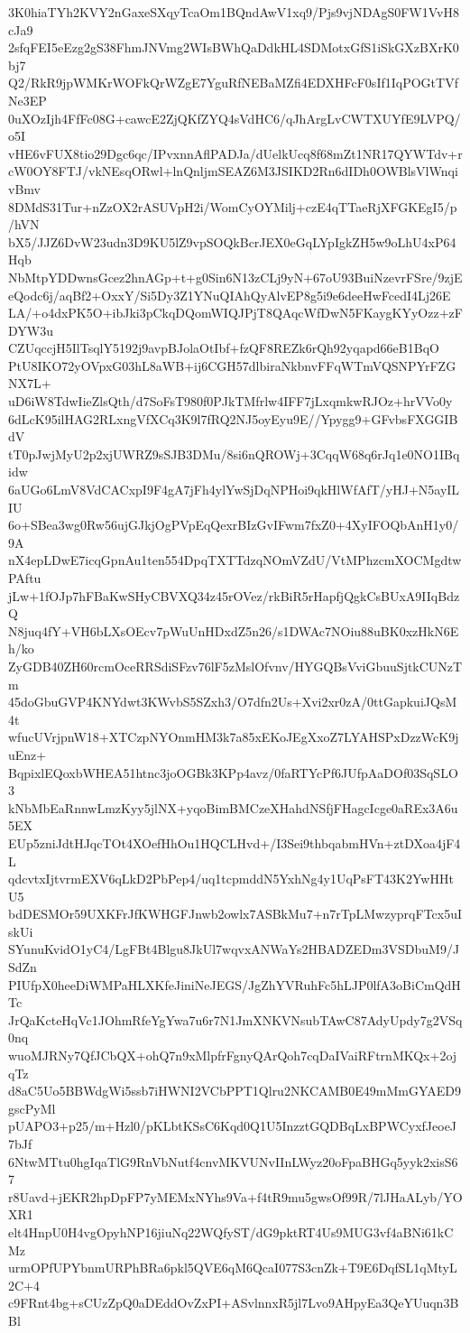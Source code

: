 3K0hiaTYh2KVY2nGaxeSXqyTcaOm1BQndAwV1xq9/Pjs9vjNDAgS0FW1VvH8cJa9
2sfqFEI5eEzg2gS38FhmJNVmg2WIsBWhQaDdkHL4SDMotxGfS1iSkGXzBXrK0bj7
Q2/RkR9jpWMKrWOFkQrWZgE7YguRfNEBaMZfi4EDXHFcF0sIf1IqPOGtTVfNe3EP
0uXOzIjh4FfFc08G+cawcE2ZjQKfZYQ4sVdHC6/qJhArgLvCWTXUYfE9LVPQ/o5I
vHE6vFUX8tio29Dgc6qc/IPvxnnAflPADJa/dUelkUcq8f68mZt1NR17QYWTdv+r
cW0OY8FTJ/vkNEsqORwl+lnQnljmSEAZ6M3JSIKD2Rn6dIDh0OWBlsVlWnqivBmv
8DMdS31Tur+nZzOX2rASUVpH2i/WomCyOYMilj+czE4qTTaeRjXFGKEgI5/p/hVN
bX5/JJZ6DvW23udn3D9KU5lZ9vpSOQkBcrJEX0eGqLYpIgkZH5w9oLhU4xP64Hqb
NbMtpYDDwnsGcez2hnAGp+t+g0Sin6N13zCLj9yN+67oU93BuiNzevrFSre/9zjE
eQodc6j/aqBf2+OxxY/Si5Dy3Z1YNuQIAhQyAlvEP8g5i9e6deeHwFcedI4Lj26E
LA/+o4dxPK5O+ibJki3pCkqDQomWIQJPjT8QAqcWfDwN5FKaygKYyOzz+zFDYW3u
CZUqccjH5IlTsqlY5192j9avpBJolaOtIbf+fzQF8REZk6rQh92yqapd66eB1BqO
PtU8IKO72yOVpxG03hL8aWB+ij6CGH57dlbiraNkbnvFFqWTmVQSNPYrFZGNX7L+
uD6iW8TdwIieZlsQth/d7SoFsT980f0PJkTMfrlw4IFF7jLxqmkwRJOz+hrVVo0y
6dLcK95ilHAG2RLxngVfXCq3K9l7fRQ2NJ5oyEyu9E//Ypygg9+GFvbsFXGGIBdV
tT0pJwjMyU2p2xjUWRZ9sSJB3DMu/8si6nQROWj+3CqqW68q6rJq1e0NO1IBqidw
6aUGo6LmV8VdCACxpI9F4gA7jFh4ylYwSjDqNPHoi9qkHlWfAfT/yHJ+N5ayILIU
6o+SBea3wg0Rw56ujGJkjOgPVpEqQexrBIzGvIFwm7fxZ0+4XyIFOQbAnH1y0/9A
nX4epLDwE7icqGpnAu1ten554DpqTXTTdzqNOmVZdU/VtMPhzcmXOCMgdtwPAftu
jLw+1fOJp7hFBaKwSHyCBVXQ34z45rOVez/rkBiR5rHapfjQgkCsBUxA9IIqBdzQ
N8juq4fY+VH6bLXsOEcv7pWuUnHDxdZ5n26/s1DWAc7NOiu88uBK0xzHkN6Eh/ko
ZyGDB40ZH60rcmOceRRSdiSFzv76lF5zMslOfvnv/HYGQBsVviGbuuSjtkCUNzTm
45doGbuGVP4KNYdwt3KWvbS5SZxh3/O7dfn2Us+Xvi2xr0zA/0ttGapkuiJQsM4t
wfucUVrjpnW18+XTCzpNYOnmHM3k7a85xEKoJEgXxoZ7LYAHSPxDzzWcK9juEnz+
BqpixlEQoxbWHEA51htnc3joOGBk3KPp4avz/0faRTYcPf6JUfpAaDOf03SqSLO3
kNbMbEaRnnwLmzKyy5jlNX+yqoBimBMCzeXHahdNSfjFHagcIcge0aREx3A6u5EX
EUp5zniJdtHJqcTOt4XOefHhOu1HQCLHvd+/I3Sei9thbqabmHVn+ztDXoa4jF4L
qdcvtxIjtvrmEXV6qLkD2PbPep4/uq1tcpmddN5YxhNg4y1UqPsFT43K2YwHHtU5
bdDESMOr59UXKFrJfKWHGFJnwb2owlx7ASBkMu7+n7rTpLMwzyprqFTcx5uIskUi
SYunuKvidO1yC4/LgFBt4Blgu8JkUl7wqvxANWaYs2HBADZEDm3VSDbuM9/JSdZn
PIUfpX0heeDiWMPaHLXKfeJiniNeJEGS/JgZhYVRuhFc5hLJP0lfA3oBiCmQdHTc
JrQaKcteHqVc1JOhmRfeYgYwa7u6r7N1JmXNKVNsubTAwC87AdyUpdy7g2VSq0nq
wuoMJRNy7QfJCbQX+ohQ7n9xMlpfrFgnyQArQoh7cqDaIVaiRFtrnMKQx+2ojqTz
d8aC5Uo5BBWdgWi5ssb7iHWNI2VCbPPT1Qlru2NKCAMB0E49mMmGYAED9gscPyMl
pUAPO3+p25/m+Hzl0/pKLbtKSsC6Kqd0Q1U5InzztGQDBqLxBPWCyxfJeoeJ7bJf
6NtwMTtu0hgIqaTlG9RnVbNutf4cnvMKVUNvIInLWyz20oFpaBHGq5yyk2xisS67
r8Uavd+jEKR2hpDpFP7yMEMxNYhs9Va+f4tR9mu5gwsOf99R/7lJHaALyb/YOXR1
elt4HnpU0H4vgOpyhNP16jiuNq22WQfyST/dG9pktRT4Us9MUG3vf4aBNi61kCMz
urmOPfUPYbnmURPhBRa6pkl5QVE6qM6QcaI077S3cnZk+T9E6DqfSL1qMtyL2C+4
c9FRnt4bg+sCUzZpQ0aDEddOvZxPI+ASvlnnxR5jl7Lvo9AHpyEa3QeYUuqn3BBl
